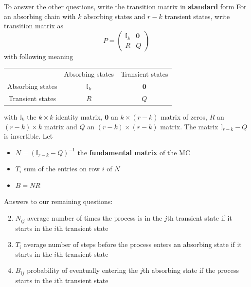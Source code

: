 \documentclass[aspectratio=169]{beamer}
\begin{document}
\begin{frame}
To answer the other questions, write the transition matrix in \textbf{standard} form
\vfill
For an absorbing chain with $k$ absorbing states and $r-k$ transient states, write transition matrix as
\[
P=\begin{pmatrix}
\mathbb{I}_k & \mathbf{0} \\
R & Q
\end{pmatrix}
\]
with following meaning
\begin{center}\footnotesize
\begin{tabular}{ccc}
& Absorbing states & Transient states \\
Absorbing states & $\mathbb{I}_k$ & $\mathbf{0}$ \\
Transient states & $R$ & $Q$
\end{tabular}
\end{center}
with $\mathbb{I}_k$ the $k\times k$ identity matrix, $\mathbf{0}$ an $k\times(r-k)$ matrix of zeros, $R$ an $(r-k)\times k$ matrix and $Q$ an $(r-k)\times(r-k)$ matrix.
The matrix $\mathbb{I}_{r-k}-Q$ is invertible. Let
\begin{itemize}
\item $N=(\mathbb{I}_{r-k}-Q)^{-1}$ the \textbf{fundamental matrix} of the MC
\item $T_i$ sum of the entries on row $i$ of $N$
\item $B=NR$
\end{itemize}
\end{frame}

\begin{frame}
Answers to our remaining questions:
\vfill
\begin{enumerate}
\setcounter{enumi}{1}
\item $N_{ij}$ average number of times the process is in the $j$th transient state if it starts in the $i$th transient state
\vfill
\item $T_i$ average number of steps before the process enters an absorbing state if it starts in the $i$th transient state
\vfill
\item $B_{ij}$ probability of eventually entering the $j$th absorbing state if the process starts in the $i$th transient state
\end{enumerate}
\vfill
\end{frame}
\end{document}
